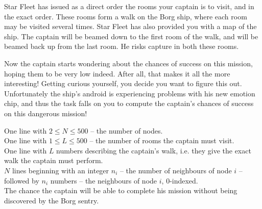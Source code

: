 Star Fleet has issued as a direct order the rooms your captain is to visit, and in the exact order. These rooms form a walk on the Borg ship, where each room may be visited several times. Star Fleet has also provided you with a map of the ship. The captain will be beamed down to the first room of the walk, and will be beamed back up from the last room. He risks capture in both these rooms. 

Now the captain starts wondering about the chances of success on this mission, hoping them to be very low indeed. After all, that makes it all the more interesting! Getting curious yourself, you decide you want to figure this out. Unfortunately the ship's android is experiencing problems with his new emotion chip, and thus the task falls on you to compute the captain's chances of success on this dangerous mission!

\Input
One line with $2 \leq N \leq 500$ -- the number of nodes.\\
One line with $1 \leq L \leq 500$ -- the number of rooms the captain must visit.\\
One line with $L$ numbers describing the captain's walk, i.e. they give the exact walk the captain must perform.\\
$N$ lines beginning with an integer $n_i$ -- the number of neighbours of node $i$ -- followed by $n_i$ numbers -- the neighbours of node $i$, $0$-indexed.\\

\Output
The chance the captain will be able to complete his mission without being discovered by the Borg sentry.\\



